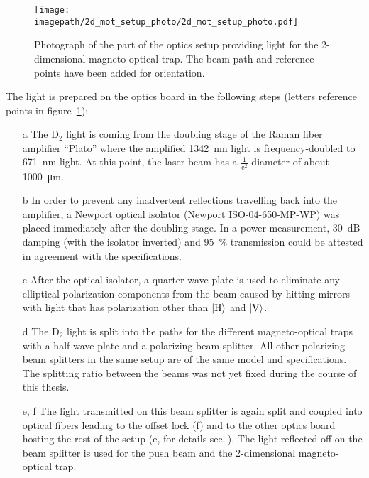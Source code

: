 \begin{figure}
    \centering
    \texttt{[image: \\imagepath/2d\_mot\_setup\_photo/2d\_mot\_setup\_photo.pdf]}
    \caption{Photograph of the part of the optics setup providing light for the 2-dimensional magneto-optical trap. The beam path and reference points have been added for orientation.}\label{fig:2d_mot_setup_photo}
\end{figure}

The light is prepared on the optics board in the following steps (letters reference points in figure~\ref{fig:2d_mot_setup_photo}):
\begin{itemize}
    \item[a] The D$_2$ light is coming from the doubling stage of the Raman fiber amplifier ``Plato'' where the amplified \SI{1342}{\nano\meter} light is frequency-doubled to \SI{671}{\nano\meter} light. At this point, the laser beam has a $\frac{1}{\text{e}^2}$ diameter of about \SI{1000}{\micro\meter}.

    \item[b] In order to prevent any inadvertent reflections travelling back into the amplifier, a Newport optical isolator (Newport ISO-04-650-MP-WP) was placed immediately after the doubling stage. In a power measurement, \SI{30}{\deci\bel} damping (with the isolator inverted) and \SI{95}{\percent} transmission could be attested in agreement with the specifications.

    \item[c] After the optical isolator, a quarter-wave plate is used to eliminate any elliptical polarization components from the beam caused by hitting mirrors with light that has polarization other than $\Ket{\text{H}}$ and $\Ket{\text{V}}$.

    \item[d] The D$_2$ light is split into the paths for the different magneto-optical traps with a half-wave plate and a polarizing beam splitter. All other polarizing beam splitters in the same setup are of the same model and specifications. The splitting ratio between the beams was not yet fixed during the course of this thesis.

    \item[e, f] The light transmitted on this beam splitter is again split and coupled into optical fibers leading to the offset lock (f) and to the other optics board hosting the rest of the setup (e, for details see~\cite{qesja_design_2022}). The light reflected off on the beam splitter is used for the push beam and the 2-dimensional magneto-optical trap.


\end{itemize}
